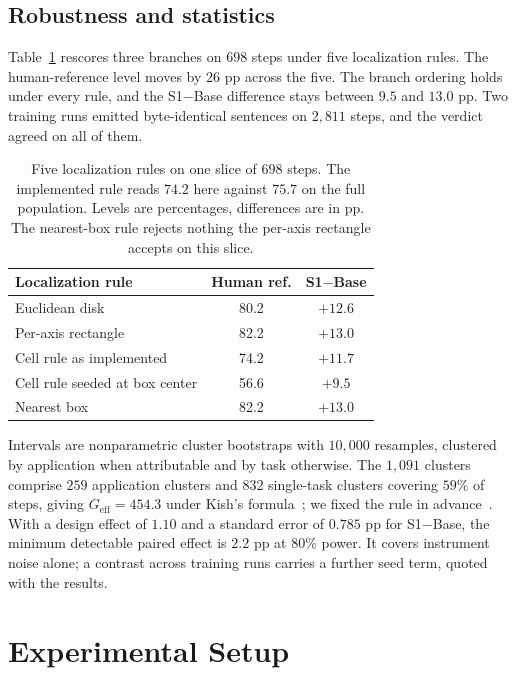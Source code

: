 \documentclass[conference]{IEEEtran}
\begin{document}
\subsection{Robustness and statistics}
Table~\ref{tab:rules} rescores three branches on $698$ steps under five localization rules. The
human-reference level moves by $26$ pp across the five. The branch ordering holds under every
rule, and the S1$-$Base difference stays between $9.5$ and $13.0$ pp. Two training runs emitted
byte-identical sentences on $2{,}811$ steps, and the verdict agreed on all of them.

\begin{table}[t]
\caption{Five localization rules on one slice of $698$ steps. The implemented rule reads $74.2$
here against $75.7$ on the full population. Levels are percentages, differences are in pp. The
nearest-box rule rejects nothing the per-axis rectangle accepts on this slice.}
\label{tab:rules}
\centering
\footnotesize
\setlength{\tabcolsep}{4pt}
\begin{tabular}{@{}lcc@{}}
\toprule
Localization rule & Human ref. & S1$-$Base \\
\midrule
Euclidean disk & 80.2 & $+12.6$ \\
Per-axis rectangle~\cite{aitw} & 82.2 & $+13.0$ \\
Cell rule as implemented & 74.2 & $+11.7$ \\
Cell rule seeded at box center & 56.6 & $+9.5$ \\
Nearest box & 82.2 & $+13.0$ \\
\bottomrule
\end{tabular}
\end{table}

Intervals are nonparametric cluster bootstraps with $10{,}000$ resamples, clustered by application
when attributable and by task otherwise. The $1{,}091$ clusters comprise $259$ application
clusters and $832$ single-task clusters covering $59\%$ of steps, giving $G_{\text{eff}} = 454.3$ under Kish's formula~\cite{kish1965}; we fixed the rule in
advance~\cite{cameron2008}. With a design effect of $1.10$
and a standard error of $0.785$ pp for S1$-$Base, the minimum detectable paired effect is $2.2$ pp
at $80\%$ power. It covers instrument noise alone; a contrast across training runs carries a
further seed term, quoted with the results.

\section{Experimental Setup}
\label{sec:design}
\end{document}

